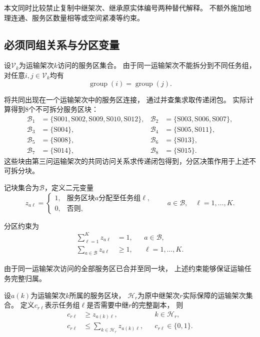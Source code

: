 \documentclass[bwprint]{gmcmthesis}
\begin{document}
本文同时比较禁止复制中继架次、继承原实体编号两种替代解释。
不额外施加地理连通、服务区数量相等或空间紧凑等约束。

\subsection{必须同组关系与分区变量}

设$\mathcal{V}_k$为运输架次$k$访问的服务区集合。
由于同一运输架次不能拆分到不同任务组，
对任意$i,j\in\mathcal{V}_k$均有
\begin{equation}
\operatorname{group}(i)=\operatorname{group}(j).
\end{equation}

将共同出现在一个运输架次中的服务区连接，
通过并查集求取传递闭包。
实际计算得到8个不可拆分服务区块：
\begin{align*}
\mathcal B_1&=\{\mathrm{S001,S002,S009,S010,S012}\},&
\mathcal B_2&=\{\mathrm{S003,S006,S007}\},\\
\mathcal B_3&=\{\mathrm{S004}\},&
\mathcal B_4&=\{\mathrm{S005,S011}\},\\
\mathcal B_5&=\{\mathrm{S008}\},&
\mathcal B_6&=\{\mathrm{S013}\},\\
\mathcal B_7&=\{\mathrm{S014}\},&
\mathcal B_8&=\{\mathrm{S015}\}.
\end{align*}
这些块由第三问运输架次的共同访问关系求传递闭包得到，分区决策作用于上述不可拆分块。

记块集合为$\mathcal{B}$，定义二元变量
\begin{equation}
z_{a\ell}=
\begin{cases}
1, & \text{服务区块$a$分配至任务组$\ell$},\\
0, & \text{否则},
\end{cases}
\qquad
a\in\mathcal{B},\quad \ell=1,\ldots,K.
\end{equation}

分区约束为
\begin{align}
\sum_{\ell=1}^{K}z_{a\ell}&=1,
&& a\in\mathcal{B},\\
\sum_{a\in\mathcal{B}}z_{a\ell}&\geq 1,
&& \ell=1,\ldots,K.
\end{align}

由于同一运输架次访问的全部服务区已合并至同一块，
上述约束能够保证运输任务完整归属。

设$a(k)$为运输架次$k$所属的服务区块，
$\mathcal{H}_r$为原中继架次$r$实际保障的运输架次集合。
定义$c_{r\ell}$表示任务组$\ell$是否需要中继$r$的完整副本，
则
\begin{align}
c_{r\ell}&\geq z_{a(k)\ell},
&& k\in\mathcal{H}_r,\\
c_{r\ell}&\leq
\sum_{k\in\mathcal{H}_r}z_{a(k)\ell},
&& c_{r\ell}\in\{0,1\}.
\end{align}
\end{document}

